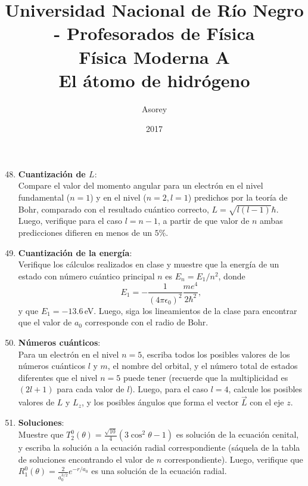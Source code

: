 \documentclass[a4paper,12pt]{article}
\begin{document}
\title{
{\normalsize{Universidad Nacional de Río Negro - Profesorados de Física}}\\
Física Moderna A \\ El átomo de hidrógeno\\}
\author{Asorey}
\date{2017}
\maketitle

\begin{enumerate}
	\setcounter{enumi}{47}      %
	
	\item {\bf{Cuantización de $L$}}:\\
		Compare el valor del momento angular para un electrón en el nivel
		fundamental ($n=1$) y en el nivel ($n=2, l=1$) predichos por la teoría
		de Bohr, comparado con el resultado cuántico correcto, $L=\sqrt{l(l-1)}
		\hbar$. Luego, verifique para el caso $l=n-1$, a partir de que valor de
		$n$ ambas predicciones difieren en menos de un $5\%$. 

	\item {\bf{Cuantización de la energía}}:\\
		Verifique los cálculos realizados en clase y muestre que la energía de
		un estado con número cuántico principal $n$ es $E_n=E_1 / n^2$, donde
		$$E_1= -\frac{1}{(4\pi\epsilon_0)^2} \frac{m e^4}{2\hbar^2},$$ y que
		$E_1=-13.6$\,eV. Luego, siga los lineamientos de la clase para
		encontrar que el valor de $a_0$ corresponde con el radio de Bohr.

	\item {\bf{Números cuánticos}}:\\ 
		Para un electrón en el nivel $n=5$, escriba todos los posibles
		valores de los números cuánticos $l$ y $m$, el nombre del orbital, y el
		número total de estados diferentes que el nivel $n=5$ puede tener
		(recuerde que la multiplicidad es $(2l+1)$ para cada valor de $l$).
		Luego, para el caso $l=4$, calcule los posibles valores de $L$ y $L_z$,
		y los posibles ángulos que forma el vector $\vec L$ con el eje $z$.

	\item {\bf{Soluciones}}:\\
		Muestre que $T_2^0(\theta) = \frac{\sqrt{10}}{4} (3 \cos^2 \theta - 1)$
		es solución de la ecuación cenital, y escriba la solución a la ecuación
		radial correspondiente (sáquela de la tabla de soluciones encontrando
		el valor de $n$ correspondiente). Luego, verifique que $R_1^0(\theta) =
		\frac{2}{a_0^{3/2}} e^{-r/a_0}$ es una solución de la ecuación radial.


\end{enumerate}
\end{document}
